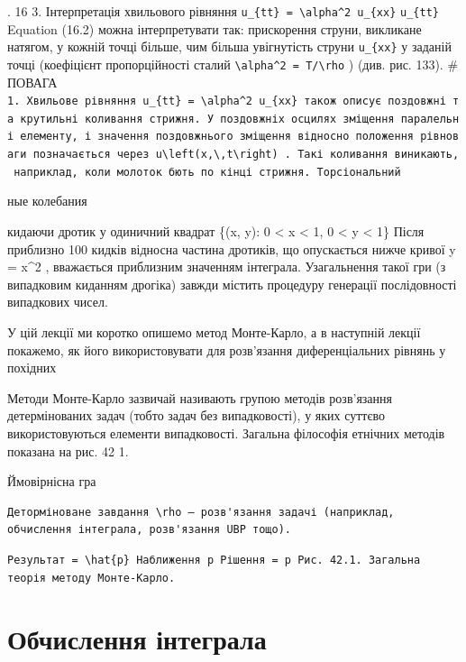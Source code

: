 \documentclass[
  ukrainian,
]{article}
\begin{document}
. 16 3. Інтерпретація хвильового рівняння
\texttt{u\_\{tt\}\ =\ \textbackslash{}alpha\^{}2\ u\_\{xx\}}
\texttt{u\_\{tt\}} Equation (16.2) можна інтерпретувати так: прискорення
струни, викликане натягом, у кожній точці більше, чим більша увігнутість
струни \texttt{u\_\{xx\}} у заданій точці (коефіцієнт пропорційності
сталий \texttt{\textbackslash{}alpha\^{}2\ =\ T/\textbackslash{}rho} )
(див. рис. 133). \# ПОВАГА
\texttt{1.\ Хвильове\ рівняння\ \textquotesingle{}u\_\{tt\}\ =\ \textbackslash{}alpha\^{}2\ u\_\{xx\}\textquotesingle{}\ також\ описує\ поздовжні\ та\ крутильні\ коливання\ стрижня.\ У\ поздовжніх\ осцилях\ зміщення\ паралельні\ елементу,\ і\ значення\ поздовжнього\ зміщення\ відносно\ положення\ рівноваги\ позначається\ через\ \textquotesingle{}u\textbackslash{}left(x,\textbackslash{},t\textbackslash{}right)\textquotesingle{}\ .\ Такі\ коливання\ виникають,\ наприклад,\ коли\ молоток\ б\textquotesingle{}ють\ по\ кінці\ стрижня.\ Торсіональний}

ные колебания

кидаючи дротик у одиничний квадрат \{(x, y): 0 \textless{} x \textless{}
1, 0 \textless{} y \textless{} 1\} Після приблизно 100 кидків відносна
частина дротиків, що опускається нижче кривої y = x\^{}2 , вважається
приблизним значенням інтеграла. Узагальнення такої гри (з випадковим
киданням дрогіка) завжди містить процедуру генерації послідовності
випадкових чисел.

У цій лекції ми коротко опишемо метод Монте-Карло, а в наступній лекції
покажемо, як його використовувати для розв'язання диференціальних
рівнянь у похідних

Методи Монте-Карло зазвичай називають групою методів розв'язання
детермінованих задач (тобто задач без випадковості), у яких суттєво
використовуються елементи випадковості. Загальна філософія етнічних
методів показана на рис. 42 1.

Ймовірнісна гра

\begin{verbatim}
Деторміноване завдання \rho — розв'язання задачі (наприклад, обчислення інтеграла, розв'язання UBP тощо).
\end{verbatim}

\begin{verbatim}
Результат = \hat{p} Наближення p Рішення = p Рис. 42.1. Загальна теорія методу Монте-Карло.
\end{verbatim}

\section{Обчислення
інтеграла}\label{ux43eux431ux447ux438ux441ux43bux435ux43dux43dux44f-ux456ux43dux442ux435ux433ux440ux430ux43bux430}
\end{document}
